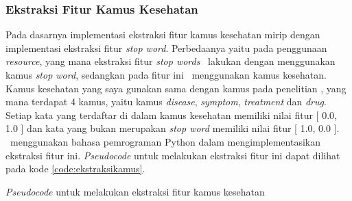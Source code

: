 \subsubsection{Ekstraksi Fitur Kamus Kesehatan}
Pada dasarnya implementasi ekstraksi fitur kamus kesehatan mirip dengan implementasi ekstraksi fitur \textit{stop word}. Perbedaanya yaitu pada penggunaan \textit{resource}, yang mana ekstraksi fitur \textit{stop words} \saya~lakukan dengan menggunakan kamus \textit{stop word}, sedangkan pada fitur ini \saya~menggunakan kamus kesehatan. Kamus kesehatan yang saya gunakan sama dengan kamus pada penelitian \cite{skripsiKakRadit}, yang mana terdapat 4 kamus, yaitu kamus \textit{disease}, \textit{symptom}, \textit{treatment} dan \textit{drug}. Setiap kata yang terdaftar di dalam kamus kesehatan memiliki nilai fitur [ 0.0, 1.0 ] dan kata yang bukan merupakan \textit{stop word} memiliki nilai fitur [ 1.0, 0.0 ]. \Saya~menggunakan bahasa pemrograman Python dalam mengimplementasikan ekstraksi fitur ini. \textit{Pseudocode} untuk melakukan ekstraksi fitur ini dapat dilihat pada kode \ref{code:ekstraksikamus}.

\begin{kode}

	
	\SetAlgoLined
	\BlankLine
	
	
	\caption{\textit{Pseudocode} untuk melakukan ekstraksi fitur kamus kesehatan}
	\label{code:ekstraksikamus}	
\end{kode}

